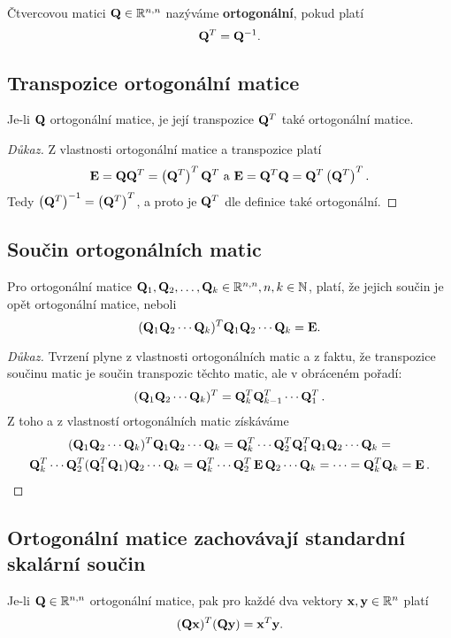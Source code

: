 Čtvercovou matici $\mathbf{Q}\in\mathbb{R}^{n,n}$ nazýváme \textbf{ortogonální}, pokud platí
\[ \mathbf{Q}^T = \mathbf{Q}^{-1}. \]

\subsection*{Transpozice ortogonální matice}

Je-li $\mathbf{Q}$ ortogonální matice, je její transpozice $\mathbf{Q}^T$ také ortogonální matice.


\begin{proof}[Důkaz]
	Z vlastnosti ortogonální matice a transpozice platí 
	\[ \mathbf{E}=\mathbf{Q}\mathbf{Q}^T = \left(\mathbf{Q}^T\right)^T\mathbf{Q}^T  \text{ a } \mathbf{E}=\mathbf{Q}^T\mathbf{Q} = \mathbf{Q}^T\left(\mathbf{Q}^T\right)^T. \]
	Tedy $\left(\mathbf{Q}^T\right)^{-1}=\left(\mathbf{Q}^T\right)^T$, a proto je $\mathbf{Q}^T$ dle definice také ortogonální.
\end{proof}

\subsection*{Součin ortogonálních matic}

Pro ortogonální matice $\mathbf{Q}_1, \mathbf{Q}_2, \ldots, \mathbf{Q}_k \in \mathbb{R}^{n,n}, n,k \in \mathbb{N}$, platí, že jejich součin je opět ortogonální matice, neboli
\[ (\mathbf{Q}_1\mathbf{Q}_2 \cdots \mathbf{Q}_k)^T\mathbf{Q}_1\mathbf{Q}_2 \cdots \mathbf{Q}_k = \mathbf{E}. \]

\begin{proof}[Důkaz]
Tvrzení plyne z vlastnosti ortogonálních matic a z faktu, že transpozice součinu matic je součin transpozic těchto matic, ale v obráceném pořadí:
\[ (\mathbf{Q}_1\mathbf{Q}_2 \cdots\mathbf{Q}_k)^T = \mathbf{Q}_k^T\mathbf{Q}_{k-1}^T \cdots\mathbf{Q}_1^T\,. \]
Z toho a z vlastností ortogonálních matic získáváme
	\begin{gather*}
		(\mathbf{Q}_1\mathbf{Q}_2 \cdots\mathbf{Q}_k)^T\mathbf{Q}_1\mathbf{Q}_2 \cdots\mathbf{Q}_k = \mathbf{Q}_k^T \cdots\mathbf{Q}_2^T\mathbf{Q}_1^T\mathbf{Q}_1\mathbf{Q}_2 \cdots\mathbf{Q}_k = \\
		\mathbf{Q}_k^T \cdots\mathbf{Q}_2^T(\mathbf{Q}_1^T\mathbf{Q}_1)\mathbf{Q}_2 \cdots\mathbf{Q}_k =
		\mathbf{Q}_k^T \cdots\mathbf{Q}_2^T\,\mathbf{E}\,\mathbf{Q}_2 \cdots\mathbf{Q}_k = \cdots = \mathbf{Q}_k^T\mathbf{Q}_k =\mathbf{E}\,.
	\end{gather*}
\end{proof}

\subsection*{Ortogonální matice zachovávají standardní skalární součin}

Je-li $\mathbf{Q} \in \mathbb{R}^{n,n}$ ortogonální matice, pak pro každé dva vektory $\mathbf{x}, \mathbf{y} \in \mathbb{R}^n$ platí
\[ (\mathbf{Q}\mathbf{x})^T(\mathbf{Q}\mathbf{y}) = \mathbf{x}^T \mathbf{y}. \]

